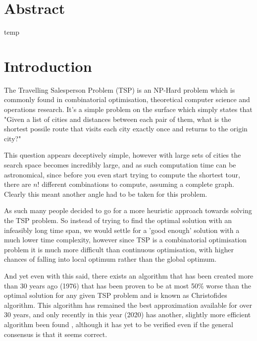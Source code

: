 \documentclass[11pt,a4paper,titlepage]{article}
\author{Alex Campbell}
\date{}
\begin{document}
\setlength{\parindent}{0em}
\setlength{\parskip}{1em}

\section*{Abstract}

temp

\pagebreak
\tableofcontents
\pagebreak

\section{Introduction}

The Travelling Salesperson Problem (TSP) is an NP-Hard problem which is commonly found in combinatorial optimisation, theoretical computer science and operations research. It's a simple problem on the surface which simply states that "Given a list of cities and distances between each pair of them, what is the shortest possile route that visits each city exactly once and returns to the origin city?" \cite{TSPWiki}

This question appears deceptively simple, however with large sets of cities the search space becomes incredibly large, and as such computation time can be astronomical, since before you even start trying to compute the shortest tour, there are $n!$ different combinations to compute, assuming a complete graph. Clearly this meant another angle had to be taken for this problem.

As such many people decided to go for a more heuristic approach towards solving the TSP problem. So instead of trying to find the optimal solution with an infeasibly long time span, we would settle for a 'good enough' solution with a much lower time complexity, however since TSP is a combinatorial optimisation problem it is much more difficult than continuous optimisation, with higher chances of falling into local optimum rather than the global optimum.

And yet even with this said, there exists an algorithm that has been created more than 30 years ago (1976) that has been proven to be at most 50\% worse than the optimal solution for any given TSP problem and is known as Christofides algorithm. This algorithm has remained the best approximation available for over 30 years, and only recently in this year (2020) has another, slightly more efficient algorithm been found \cite{TSP2020}, although it has yet to be verified even if the general consensus is that it seems correct.
\end{document}
